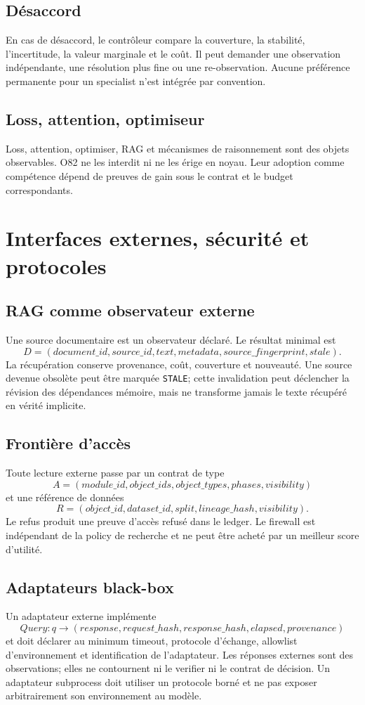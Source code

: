 \documentclass[11pt,a4paper]{report}
\begin{document}
\section{Désaccord}
En cas de désaccord, le contrôleur compare la couverture, la stabilité, l'incertitude, la valeur marginale et le coût. Il peut demander une observation indépendante, une résolution plus fine ou une re-observation. Aucune préférence permanente pour un specialist n'est intégrée par convention.

\section{Loss, attention, optimiseur}
Loss, attention, optimiser, RAG et mécanismes de raisonnement sont des objets observables. O82 ne les interdit ni ne les érige en noyau. Leur adoption comme compétence dépend de preuves de gain sous le contrat et le budget correspondants.

\chapter{Interfaces externes, sécurité et protocoles}
\section{RAG comme observateur externe}
Une source documentaire est un observateur déclaré. Le résultat minimal est
\[
D=(document\_id,source\_id,text,metadata,source\_fingerprint,stale).
\]
La récupération conserve provenance, coût, couverture et nouveauté. Une source devenue obsolète peut être marquée \texttt{STALE}; cette invalidation peut déclencher la révision des dépendances mémoire, mais ne transforme jamais le texte récupéré en vérité implicite.

\section{Frontière d'accès}
Toute lecture externe passe par un contrat de type
\[
A=(module\_id,object\_ids,object\_types,phases,visibility)
\]
et une référence de données
\[
R=(object\_id,dataset\_id,split,lineage\_hash,visibility).
\]
Le refus produit une preuve d'accès refusé dans le ledger. Le firewall est indépendant de la policy de recherche et ne peut être acheté par un meilleur score d'utilité.

\section{Adaptateurs black-box}
Un adaptateur externe implémente
\[
Query:q\to(response,request\_hash,response\_hash,elapsed,provenance)
\]
et doit déclarer au minimum timeout, protocole d'échange, allowlist d'environnement et identification de l'adaptateur. Les réponses externes sont des observations; elles ne contournent ni le verifier ni le contrat de décision. Un adaptateur subprocess doit utiliser un protocole borné et ne pas exposer arbitrairement son environnement au modèle.
\end{document}
